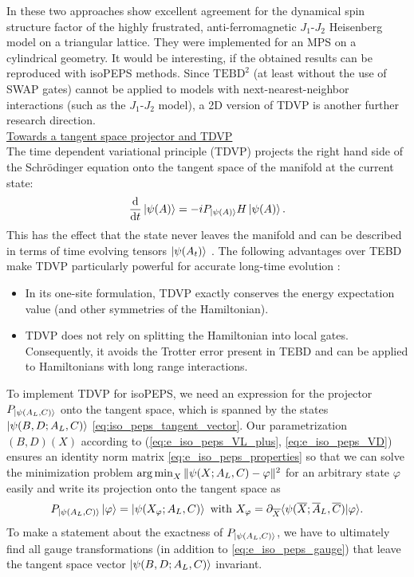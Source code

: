 In \cite{drescher2023dynamical} these two approaches show excellent agreement for the dynamical spin structure factor of the highly frustrated, anti-ferromagnetic $J_1$-$J_2$ Heisenberg model on a triangular lattice. They were implemented for an MPS on a cylindrical geometry. It would be interesting, if the obtained results can be reproduced with isoPEPS methods. Since $\text{TEBD}^2$ (at least without the use of SWAP gates) cannot be applied to models with next-nearest-neighbor interactions (such as the $J_1$-$J_2$ model), a 2D version of TDVP is another further research direction. \\[1em]

\noindent \underline{Towards a tangent space projector and TDVP} \\[0.5em]
The time dependent variational principle (TDVP) projects the right hand side of the Schrödinger equation onto the tangent space of the manifold at the current state:
\begin{equation}
	\frac{\mathrm{d}}{\mathrm{d}t} \ket{\psi(A)} = -i P_{\ket{\psi(A)}} H \ket{\psi(A)}.
\end{equation}
This has the effect that the state never leaves the manifold and can be described in terms of time evolving tensors $\ket{\psi(A_t)}$ \cite{haegeman2016unifying}. The following advantages over TEBD make TDVP particularly powerful for accurate long-time evolution \cite{haegeman2013post}:
\begin{itemize}
	\item In its one-site formulation, TDVP exactly conserves the energy expectation value (and other symmetries of the Hamiltonian).
	\item TDVP does not rely on splitting the Hamiltonian into local gates. Consequently, it avoids the Trotter error present in TEBD and can be applied to Hamiltonians with long range interactions. 
\end{itemize}
To implement TDVP for isoPEPS, we need an expression for the projector $P_{\ket{\psi(A_L, C)}}$ onto the tangent space, which is spanned by the states $\ket{\psi(B, D; A_L, C)}$ \eqref{eq:iso_peps_tangent_vector}. Our parametrization $(B, D)(X)$ according to (\ref{eq:e_iso_peps_VL_plus}, \ref{eq:e_iso_peps_VD}) ensures an identity norm matrix \eqref{eq:e_iso_peps_properties} so that we can solve the minimization problem $\operatorname*{arg\,min}_X \Vert \psi(X; A_L, C) - \varphi \Vert^2$ for an arbitrary state $\varphi$ easily and write its projection onto the tangent space as
\begin{equation}
	P_{\ket{\psi(A_L, C)}} \ket{\varphi} = \ket{\psi(X_{\varphi}; A_L, C)}
	\text{ with } X_{\varphi} = \partial_{\overline{X}} \langle \psi(\overline{X}; \overline{A}_L, \overline{C}) \vert \varphi \rangle.
\end{equation}
To make a statement about the exactness of $P_{\ket{\psi(A_L, C)}}$, we have to ultimately find all gauge transformations (in addition to \eqref{eq:e_iso_peps_gauge}) that leave the tangent space vector $\ket{\psi(B, D; A_L, C)}$ invariant.